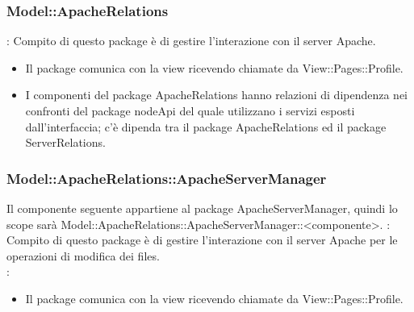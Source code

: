 \subsubsection{Model::ApacheRelations}{
		\textbf{\tipo}: Compito di questo package è di gestire l'interazione con il server Apache.\\
		\begin{itemize}
			\item Il package comunica con la view ricevendo chiamate da View::Pages::Profile.
			\item I componenti del package ApacheRelations hanno relazioni di dipendenza nei confronti del package nodeApi del quale utilizzano i servizi esposti dall’interfaccia; c’è dipenda tra il package ApacheRelations ed il package ServerRelations.\\
		\end{itemize}

\subsubsection{Model::ApacheRelations::ApacheServerManager}{
	Il componente seguente appartiene al package ApacheServerManager, quindi lo scope sarà Model::ApacheRelations::ApacheServerManager::<componente>.
		\textbf{\tipo}: Compito di questo package è di gestire l'interazione con il server Apache per le operazioni di modifica dei files.\\
		\textbf{\relaz}:
		\begin{itemize}
			\item Il package comunica con la view ricevendo chiamate da View::Pages::Profile.
		\end{itemize}

}}
